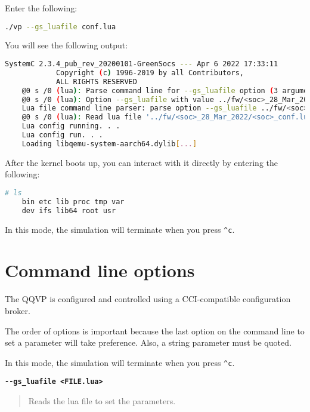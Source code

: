 Enter the following:

\small
\begin{lstlisting}[language=bash]
    ./vp --gs_luafile conf.lua
\end{lstlisting}
\normalsize

You will see the following output:

\small
\begin{lstlisting}[language=bash]
            SystemC 2.3.4_pub_rev_20200101-GreenSocs --- Apr 6 2022 17:33:11
            Copyright (c) 1996-2019 by all Contributors,
            ALL RIGHTS RESERVED
    @0 s /0 (lua): Parse command line for --gs_luafile option (3 arguments)
    @0 s /0 (lua): Option --gs_luafile with value ../fw/<soc>_28_Mar_2022/<soc>_conf.lua
    Lua file command line parser: parse option --gs_luafile ../fw/<soc>_28_Mar_2022/<soc>_conf.lua
    @0 s /0 (lua): Read lua file '../fw/<soc>_28_Mar_2022/<soc>_conf.lua'
    Lua config running. . .
    Lua config run. . .
    Loading libqemu-system-aarch64.dylib[...]
\end{lstlisting}
\normalsize


After the kernel boots up, you can interact with it directly by entering the following:

\small
\begin{lstlisting}[language=bash]
    # ls
    bin etc lib proc tmp var
    dev ifs lib64 root usr
\end{lstlisting}
\normalsize

\note In this mode, the simulation will terminate when you press {\small{\lstinline!^c!}}.


\clearpage
\section{Command line options}

The QQVP is configured and controlled using a CCI-compatible configuration broker.

The order of options is important because the last option on the command line to set a parameter will take preference. Also, a string parameter must be quoted.

\note In this mode, the simulation will terminate when you press {\small{\lstinline!^c!}}.

{\textbf {\footnotesize{\lstinline!--gs_luafile <FILE.lua>!}}}
\vspace{-2pt}
\begin{quote}
Reads the lua file to set the parameters.
\end{quote}

